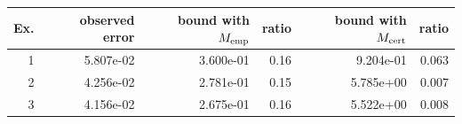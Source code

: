 \begin{tabular}{rrrrrr}
\toprule
Ex. & observed error & bound with $M_{\rm emp}$ & ratio & bound with $M_{\rm cert}$ & ratio\\
\midrule
1 & 5.807e-02 & 3.600e-01 & 0.16 & 9.204e-01 & 0.063\\
2 & 4.256e-02 & 2.781e-01 & 0.15 & 5.785e+00 & 0.007\\
3 & 4.156e-02 & 2.675e-01 & 0.16 & 5.522e+00 & 0.008\\
\bottomrule
\end{tabular}